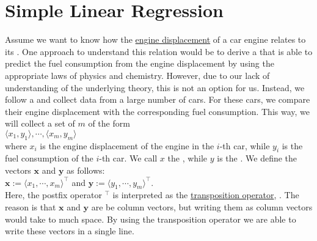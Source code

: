 \section{Simple Linear Regression}
Assume we want to know how the \href{https://en.wikipedia.org/wiki/Engine_displacement}{engine displacement} of
a car engine relates to its .  One approach to understand this relation would be to derive a
 that is able to predict the fuel consumption from the engine displacement by using the
appropriate laws of physics and chemistry.  However, due to our lack of understanding of the underlying theory,
this is not an option for us.  Instead, we follow a  and collect data from a large number
of cars.  For these cars, we compare their engine displacement with the corresponding fuel consumption.  This
way, we will collect a set of $m$  of the form
\\[0.2cm]
\hspace*{1.3cm}
$\langle x_1, y_1\rangle, \cdots, \langle x_m, y_m\rangle$ 
\\[0.2cm]
where $x_i$ is the engine displacement of the engine in the $i$-th car, while $y_i$ is the fuel consumption of the
$i$-th car.  We call $x$ the ,  while $y$ is the 
.   We define the vectors $\mathbf{x}$ and $\mathbf{y}$ as follows:
\\[0.2cm]
\hspace*{1.3cm}
$\mathbf{x} := \langle x_1, \cdots, x_m \rangle^\top$ \quad and \quad
$\mathbf{y} := \langle y_1, \cdots, y_m \rangle^\top$.
\\[0.2cm]
Here, the postfix operator $^\top$ is interpreted as the
\href{https://en.wikipedia.org/wiki/Transpose}{transposition operator}, .
The reason is that $\mathbf{x}$ and $\mathbf{y}$ are be column vectors, but writing them as column vectors
would take to much space.  By using the transposition operator we are able to write these vectors in a single 
line. 

